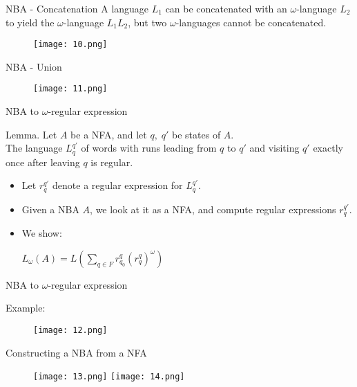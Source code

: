 \documentclass[17pt, t, lualatex]{beamer}
\begin{document}
\begin{frame}{NBA - Concatenation}
A language $L_1$ can be concatenated with an $\omega$-language $L_2$ to 
yield the $\omega$-language $L_1L_2$, but two $\omega$-languages cannot be concatenated.
    \begin{figure}
        \centering
        \texttt{[image: 10.png]}
    \end{figure}
\end{frame}

\begin{frame}{NBA - Union}
    \begin{figure}
        \centering
        \texttt{[image: 11.png]}
    \end{figure}
\end{frame}

\begin{frame}{NBA to $\omega$-regular expression}
\begin{block}{Lemma.}
 Let $A$ be a NFA, and let $q,\;q'$
be states of $A$.\\
The language $L_q^{q'}$ of words with runs leading from $q$ to $q'$ and visiting $q'$ exactly once after leaving $q$ is regular.
\begin{itemize}
    \item Let $r_q^{q'}$ denote a regular expression for $L_q^{q'}$.
    \item Given a NBA $A$, we look at it as a NFA, and compute regular expressions $r_q^{q'}$.
    \item We show:
    \begin{center}
        $L_{\omega}(A)=L\left(\sum_{q\in F} r_{q_0}^q (r_q^q)^{\omega}\right)$
    \end{center}
\end{itemize}
\end{block}    
\end{frame}

\begin{frame}{NBA to $\omega$-regular expression}
\begin{block}{Example:}
    \begin{figure}
        \centering
        \texttt{[image: 12.png]}
    \end{figure}
\end{block}
\end{frame}

\begin{frame}{Constructing a NBA from a NFA}
    \begin{figure}
        \centering
        \texttt{[image: 13.png]}
        \texttt{[image: 14.png]}
    \end{figure}
\end{frame}
\end{document}
